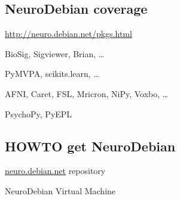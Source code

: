 \documentclass[letterpaper,landscape]{report}
\begin{document}
\begin{multicols}{3}
\subsection*{NeuroDebian coverage}
\begin{flushright}
\vspace{-0.5em}
\url{http://neuro.debian.net/pkgs.html}
\vspace{-1em}
\end{flushright}
\begin{description}[nolistsep,leftmargin=1pc,topsep=0em]
\item[Electrophysiology] BioSig, Sigviewer, Brian, \ldots
\item[Machine Learning] PyMVPA, scikits.learn, \ldots
\item[Medical Imaging] AFNI, Caret, FSL, Mricron, NiPy, Voxbo, \ldots
\item[Psychophysics] PsychoPy, PyEPL
\end{description}




\subsection*{HOWTO get NeuroDebian}
\begin{description}[nolistsep,leftmargin=1pc]
\item[Debian/Ubuntu]\url{neuro.debian.net} repository
\item[Others] NeuroDebian Virtual Machine
\end{description}

\end{multicols}
\end{document}
